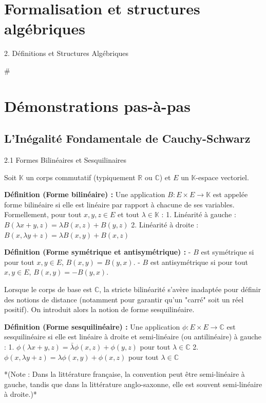 \documentclass[11pt,a4paper]{report}
\begin{document}
\chapter{Formalisation et structures algébriques}

2. Définitions et Structures Algébriques

\#

\chapter{Démonstrations pas-à-pas}
\section{L'Inégalité Fondamentale de Cauchy-Schwarz}

2.1 Formes Bilinéaires et Sesquilinaires

Soit $\mathbb{K}$ un corps commutatif (typiquement $\mathbb{R}$ ou $\mathbb{C}$) et $E$ un $\mathbb{K}$-espace vectoriel.

\textbf{Définition (Forme bilinéaire) :}
Une application $B : E \times E \to \mathbb{K}$ est appelée forme bilinéaire si elle est linéaire par rapport à chacune de ses variables. Formellement, pour tout $x, y, z \in E$ et tout $\lambda \in \mathbb{K}$ :
1. Linéarité à gauche : $B(\lambda x + y, z) = \lambda B(x, z) + B(y, z)$
2. Linéarité à droite : $B(x, \lambda y + z) = \lambda B(x, y) + B(x, z)$

\textbf{Définition (Forme symétrique et antisymétrique) :}
- $B$ est symétrique si pour tout $x, y \in E$, $B(x, y) = B(y, x)$.
- $B$ est antisymétrique si pour tout $x, y \in E$, $B(x, y) = -B(y, x)$.

Lorsque le corps de base est $\mathbb{C}$, la stricte bilinéarité s'avère inadaptée pour définir des notions de distance (notamment pour garantir qu'un "carré" soit un réel positif). On introduit alors la notion de forme sesquilinéaire.

\textbf{Définition (Forme sesquilinéaire) :}
Une application $\phi : E \times E \to \mathbb{C}$ est sesquilinéaire si elle est linéaire à droite et semi-linéaire (ou antilinéaire) à gauche :
1. $\phi(\lambda x + y, z) = \bar{\lambda} \phi(x, z) + \phi(y, z)$ pour tout $\lambda \in \mathbb{C}$
2. $\phi(x, \lambda y + z) = \lambda \phi(x, y) + \phi(x, z)$ pour tout $\lambda \in \mathbb{C}$

*(Note : Dans la littérature française, la convention peut être semi-linéaire à gauche, tandis que dans la littérature anglo-saxonne, elle est souvent semi-linéaire à droite.)*
\end{document}
